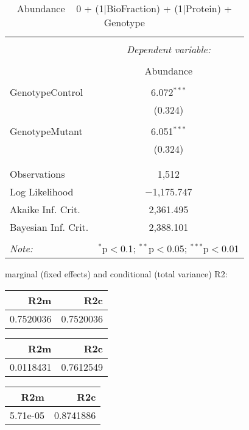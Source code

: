 \documentclass[11pt]{report}
\begin{document}
\begin{table}[!htbp] \centering 
  \caption{Abundance ~ 0 + (1|BioFraction) + (1|Protein) + Genotype} 
  \label{} 
\begin{tabular}{@{\extracolsep{5pt}}lc} 
\\[-1.8ex]\hline 
\hline \\[-1.8ex] 
 & \multicolumn{1}{c}{\textit{Dependent variable:}} \\ 
\cline{2-2} 
\\[-1.8ex] & Abundance \\ 
\hline \\[-1.8ex] 
 GenotypeControl & 6.072$^{***}$ \\ 
  & (0.324) \\ 
  & \\ 
 GenotypeMutant & 6.051$^{***}$ \\ 
  & (0.324) \\ 
  & \\ 
\hline \\[-1.8ex] 
Observations & 1,512 \\ 
Log Likelihood & $-$1,175.747 \\ 
Akaike Inf. Crit. & 2,361.495 \\ 
Bayesian Inf. Crit. & 2,388.101 \\ 
\hline 
\hline \\[-1.8ex] 
\textit{Note:}  & \multicolumn{1}{r}{$^{*}$p$<$0.1; $^{**}$p$<$0.05; $^{***}$p$<$0.01} \\ 
\end{tabular} 
\end{table} 
marginal (fixed effects) and conditional (total variance) R2:

\begin{tabular}{r|r}
\hline
R2m & R2c\\
\hline
0.7520036 & 0.7520036\\
\hline
\end{tabular}

\begin{tabular}{r|r}
\hline
R2m & R2c\\
\hline
0.0118431 & 0.7612549\\
\hline
\end{tabular}

\begin{tabular}{r|r}
\hline
R2m & R2c\\
\hline
5.71e-05 & 0.8741886\\
\hline
\end{tabular}
\end{document}
